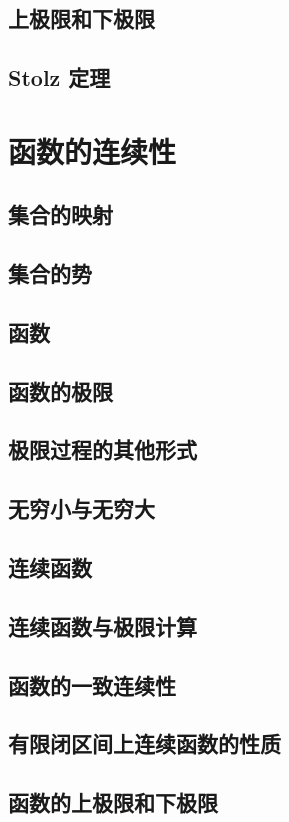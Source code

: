 \documentclass[a4paper, 12pt]{ctexbook}
\begin{document}
        \section{上极限和下极限}
        \section{Stolz 定理}
            
    \chapter{函数的连续性}
        \section{集合的映射}
        \section{集合的势}
        \section{函数}
        \section{函数的极限}
        \section{极限过程的其他形式}
        \section{无穷小与无穷大}
        \section{连续函数}
        \section{连续函数与极限计算}
        \section{函数的一致连续性}
        \section{有限闭区间上连续函数的性质}
        \section{函数的上极限和下极限}
\end{document}
